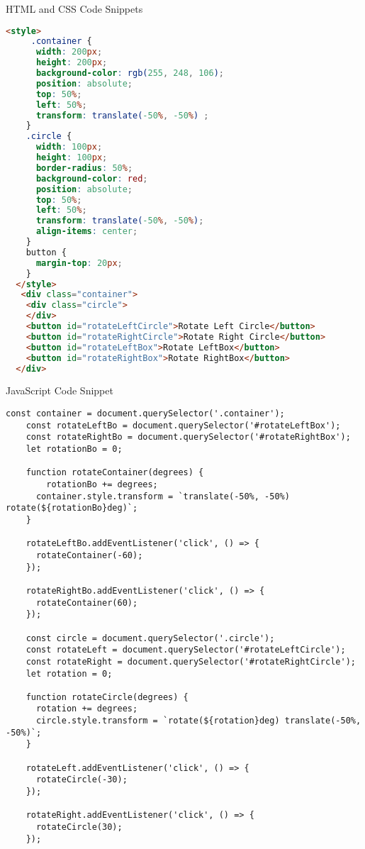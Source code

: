 \documentclass{article}
\begin{document}
HTML and CSS Code Snippets
\begin{lstlisting}[language=HTML]
 <style>
     .container {
      width: 200px;
      height: 200px;
      background-color: rgb(255, 248, 106);
      position: absolute;
      top: 50%;
      left: 50%;
      transform: translate(-50%, -50%) ;
    }
    .circle {
      width: 100px;
      height: 100px;
      border-radius: 50%;
      background-color: red;
      position: absolute;
      top: 50%;
      left: 50%;
      transform: translate(-50%, -50%);
      align-items: center;
    }
    button {
      margin-top: 20px;
    }
  </style>
   <div class="container">
    <div class="circle">
    </div>
    <button id="rotateLeftCircle">Rotate Left Circle</button>
    <button id="rotateRightCircle">Rotate Right Circle</button>
    <button id="rotateLeftBox">Rotate LeftBox</button>
    <button id="rotateRightBox">Rotate RightBox</button>
  </div>
\end{lstlisting}
\vspace{10\baselineskip}
JavaScript Code Snippet
\begin{lstlisting}[caption=JS Task 02 (i)]
    const container = document.querySelector('.container');
    const rotateLeftBo = document.querySelector('#rotateLeftBox');
    const rotateRightBo = document.querySelector('#rotateRightBox');
    let rotationBo = 0;

    function rotateContainer(degrees) {
        rotationBo += degrees;
      container.style.transform = `translate(-50%, -50%) rotate(${rotationBo}deg)`;
    }

    rotateLeftBo.addEventListener('click', () => {
      rotateContainer(-60);
    });

    rotateRightBo.addEventListener('click', () => {
      rotateContainer(60);
    });

    const circle = document.querySelector('.circle');
    const rotateLeft = document.querySelector('#rotateLeftCircle');
    const rotateRight = document.querySelector('#rotateRightCircle');
    let rotation = 0;

    function rotateCircle(degrees) {
      rotation += degrees;
      circle.style.transform = `rotate(${rotation}deg) translate(-50%, -50%)`;
    }

    rotateLeft.addEventListener('click', () => {
      rotateCircle(-30);
    });

    rotateRight.addEventListener('click', () => {
      rotateCircle(30);
    });
\end{lstlisting}
\vspace{8\baselineskip}
\end{document}

